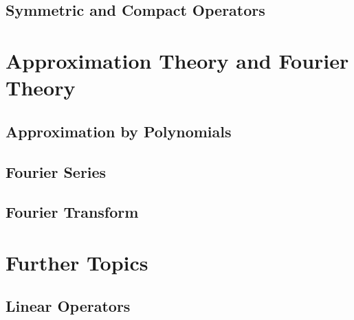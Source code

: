 \documentclass[a4paper, 12pt]{article}
\begin{document}
\subsection{Symmetric and Compact Operators}


\newpage
\section{Approximation Theory and Fourier Theory}

\subsection{Approximation by Polynomials}


\subsection{Fourier Series}


\subsection{Fourier Transform}


\newpage
\section{Further Topics}
\subsection{Linear Operators}

\end{document}
